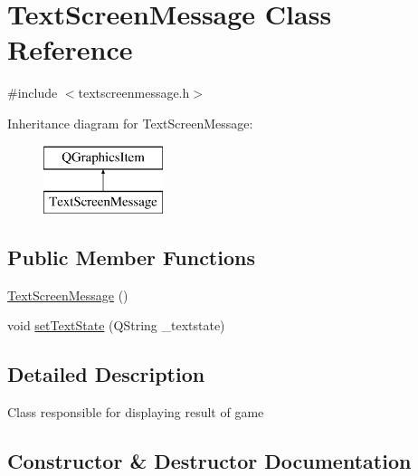 \hypertarget{class_text_screen_message}{}\section{Text\+Screen\+Message Class Reference}
\label{class_text_screen_message}


{\ttfamily \#include $<$textscreenmessage.\+h$>$}

Inheritance diagram for Text\+Screen\+Message\+:\begin{figure}[H]
\begin{center}
\leavevmode
\includegraphics[height=2.000000cm]{class_text_screen_message}
\end{center}
\end{figure}
\subsection*{Public Member Functions}
\begin{DoxyCompactItemize}
\item 
\mbox{\hyperlink{class_text_screen_message_a662c1edab7a2fc1d87804fb54672d2dd}{Text\+Screen\+Message}} ()
\item 
void \mbox{\hyperlink{class_text_screen_message_aba833b25e9b57517d22d43560ceec249}{set\+Text\+State}} (Q\+String \+\_\+textstate)
\end{DoxyCompactItemize}


\subsection{Detailed Description}
Class responsible for displaying result of game 

\subsection{Constructor \& Destructor Documentation}
\mbox{\label{class_text_screen_message_a662c1edab7a2fc1d87804fb54672d2dd}} 
